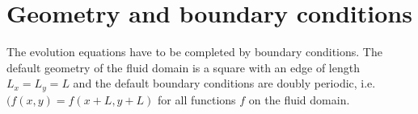 \section{Geometry and boundary conditions}
The evolution equations have to be completed by boundary conditions.  
The default geometry of the fluid domain is a square with an edge of length
$L_{x} = L_{y} = L$ and the default boundary conditions are doubly periodic,  
i.e.\ $(f(x,y) = f(x+L,y+L)$ for all functions $f$ on the fluid domain.
